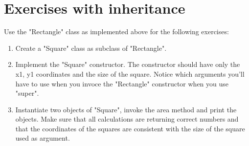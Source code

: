 \section{Exercises with inheritance}

Use the "Rectangle" class as implemented above for the following exercises:

\begin{enumerate}

\item Create a "Square" class as subclass of "Rectangle".

\item Implement the "Square" constructor. The constructor should have only the x1, y1 coordinates and the size of the square. Notice which arguments you'll have to use when you invoce the "Rectangle" constructor when you use "super".

\item Instantiate two objects of "Square", invoke the area method and print the objects. Make sure that all calculations are returning correct numbers and that the coordinates of the squares are consistent with the size of the square used as argument.

\end{enumerate}
